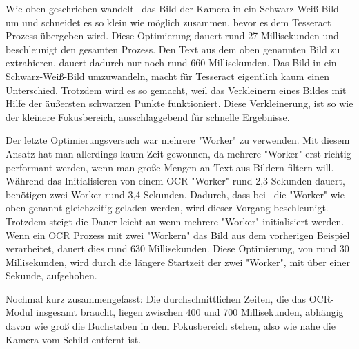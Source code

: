 Wie oben geschrieben wandelt \ZELIA\ das Bild der Kamera in ein Schwarz-Weiß-Bild um und schneidet es so klein wie möglich zusammen, bevor es dem Tesseract Prozess übergeben wird. Diese Optimierung dauert rund 27 Millisekunden und beschleunigt den gesamten Prozess. Den Text aus dem oben genannten Bild zu extrahieren, dauert dadurch nur noch rund 660 Millisekunden. Das Bild in ein Schwarz-Weiß-Bild umzuwandeln, macht für Tesseract eigentlich kaum einen Unterschied. Trotzdem wird es so gemacht, weil das Verkleinern eines Bildes mit Hilfe der äußersten schwarzen Punkte funktioniert. Diese Verkleinerung, ist so wie der kleinere Fokusbereich, ausschlaggebend für schnelle Ergebnisse. 

Der letzte Optimierungsversuch war mehrere "Worker" zu verwenden. Mit diesem Ansatz hat man allerdings kaum Zeit gewonnen, da mehrere "Worker" erst richtig performant werden, wenn man große Mengen an Text aus Bildern filtern will. Während das Initialisieren von einem OCR "Worker" rund 2,3 Sekunden dauert, benötigen zwei Worker rund 3,4 Sekunden. Dadurch, dass bei \ZELIA\ die "Worker" wie oben genannt gleichzeitig geladen werden, wird dieser Vorgang beschleunigt. Trotzdem steigt die Dauer leicht an wenn mehrere "Worker" initialisiert werden. Wenn ein OCR Prozess mit zwei "Workern" das Bild aus dem vorherigen Beispiel verarbeitet, dauert dies rund 630 Millisekunden. Diese Optimierung, von rund 30 Millisekunden, wird durch die längere Startzeit der zwei "Worker", mit über einer Sekunde, aufgehoben.

Nochmal kurz zusammengefasst: Die durchschnittlichen Zeiten, die das OCR-Modul insgesamt braucht, liegen zwischen 400 und 700 Millisekunden, abhängig davon wie groß die Buchstaben in dem Fokusbereich stehen, also wie nahe die Kamera vom Schild entfernt ist.


